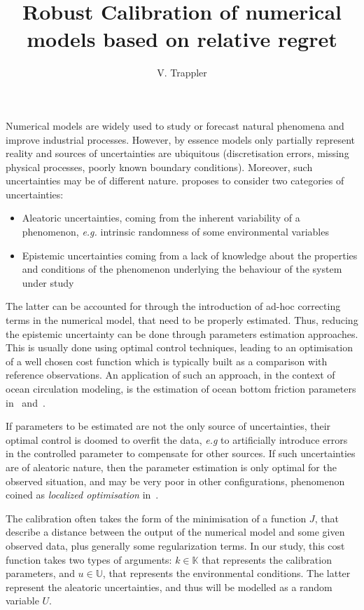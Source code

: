 \message{ !name(MascotNumTemplate.tex)}\documentclass{MascotNumAbstract}
\author{V. Trappler}
\title{Robust Calibration of numerical models based on relative regret}
\begin{document}


Numerical models are widely used to study or forecast natural phenomena and improve industrial processes. However, by essence models only partially represent reality and sources of uncertainties are ubiquitous (discretisation errors, missing physical processes, poorly known boundary conditions).  Moreover, such uncertainties may be of different nature. \cite{walker_defining_2003} proposes to consider two categories of uncertainties:
\begin{itemize}
\item Aleatoric uncertainties, coming from the inherent variability of a phenomenon, \emph{e.g.} intrinsic randomness of some environmental variables
\item Epistemic uncertainties coming from a lack of knowledge about the properties and conditions of the phenomenon underlying the behaviour of the system under study
\end{itemize}
  The latter can be accounted for through the introduction of ad-hoc correcting terms in the numerical model, that need to be properly estimated. Thus, reducing the epistemic uncertainty can be done through parameters estimation approaches. This is usually done using optimal control techniques, leading to an optimisation of a well chosen cost function which is typically built as a comparison with reference observations.
%
  An application of such an approach, in the context of ocean circulation modeling, is the estimation of ocean bottom friction parameters in~\cite{das_estimation_1991} and~\cite{boutet_estimation_2015}.

  If parameters to be estimated are not the only source of uncertainties, their optimal control 
  is doomed to overfit the data, \emph{e.g} to artificially introduce errors in the controlled parameter to compensate for other sources. If such uncertainties are of aleatoric nature, then the parameter estimation is only optimal for the observed situation, and may be very poor in other configurations, phenomenon coined as \textit{localized optimisation} in~\cite{huyse_free-form_2001}.
  
  The calibration often takes the form of the minimisation of a function $J$, that describe a distance between the output of the numerical model and some given observed data, plus generally some regularization terms.
  In our study, this cost function takes two types of arguments: $k\in\mathbb{K}$ that represents the calibration parameters, and $u\in\mathbb{U}$, that represents the environmental conditions.
The latter represent the aleatoric uncertainties, and thus will be modelled as a random variable $U$.
\end{document}
